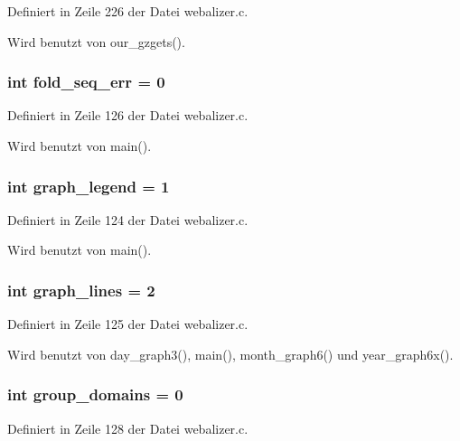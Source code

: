Definiert in Zeile 226 der Datei webalizer.c.

Wird benutzt von our\_\-gzgets().
\subsubsection{\setlength{\rightskip}{0pt plus 5cm}int {\bf fold\_\-seq\_\-err} = 0}\label{webalizer_8c_23652bde57737d1f6f700f29c4762728}




Definiert in Zeile 126 der Datei webalizer.c.

Wird benutzt von main().
\subsubsection{\setlength{\rightskip}{0pt plus 5cm}int {\bf graph\_\-legend} = 1}\label{webalizer_8c_8209c1ed16bfdf4913b7837d8d0b8520}




Definiert in Zeile 124 der Datei webalizer.c.

Wird benutzt von main().
\subsubsection{\setlength{\rightskip}{0pt plus 5cm}int {\bf graph\_\-lines} = 2}\label{webalizer_8c_b0e6606dc823003635fbd6408bd03439}




Definiert in Zeile 125 der Datei webalizer.c.

Wird benutzt von day\_\-graph3(), main(), month\_\-graph6() und year\_\-graph6x().
\subsubsection{\setlength{\rightskip}{0pt plus 5cm}int {\bf group\_\-domains} = 0}\label{webalizer_8c_3b91bd084088b32764aaa00f48083faf}




Definiert in Zeile 128 der Datei webalizer.c.

